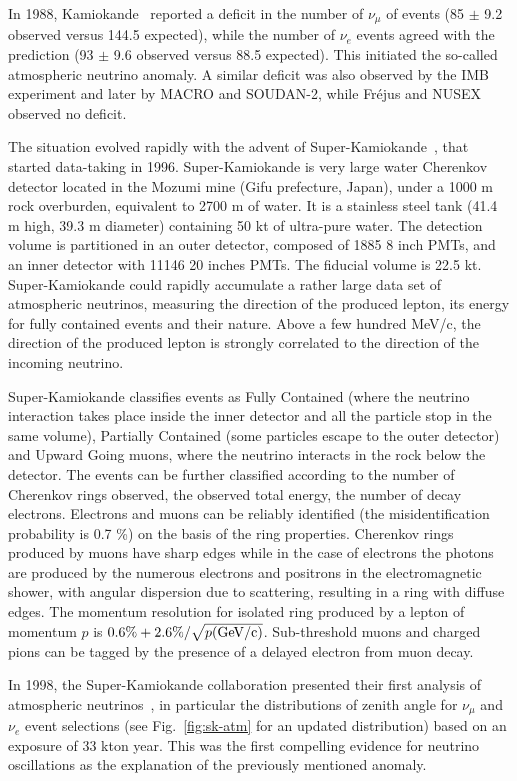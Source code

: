 In 1988, Kamiokande~\cite{kam88} reported a deficit in the number of $\nu_\mu$ of events (85 $\pm$ 9.2 observed versus 144.5 expected), while the number of $\nu_e$ events agreed with the prediction (93 $\pm$ 9.6 observed versus 88.5 expected). 
This initiated the so-called atmospheric neutrino anomaly. A similar deficit was also observed by the IMB experiment and later by MACRO and SOUDAN-2, while Fr\'ejus and NUSEX observed no deficit. 

The situation evolved rapidly with the advent of Super-Kamiokande~\cite{sknim}, that started data-taking in 1996. Super-Kamiokande is very large water Cherenkov detector located in the Mozumi mine (Gifu prefecture, Japan), under a 1000 m rock overburden, equivalent to 2700 m of water. It is a stainless steel tank (41.4 m high, 39.3 m diameter) containing 50 kt of ultra-pure water. The detection volume is partitioned in an outer detector, composed of 1885 8 inch PMTs, and an inner detector with 11146 20 inches PMTs. The fiducial volume is 22.5 kt. Super-Kamiokande could rapidly accumulate a rather large data set of atmospheric neutrinos, measuring the direction of the produced lepton, its energy for fully contained events and their nature. Above a few hundred MeV/c, the direction of the produced lepton is strongly correlated to the direction of the incoming neutrino.

Super-Kamiokande classifies events as Fully Contained (where the neutrino interaction takes place inside the inner detector and all the particle stop in the same volume), Partially Contained (some particles escape to the outer detector) and Upward Going muons, where the neutrino interacts in the rock below the detector. The events can be further classified according to the number of Cherenkov rings observed, the observed total energy, the number of decay electrons. Electrons and muons can be reliably identified (the misidentification probability is 0.7 \%) on the basis of the ring properties. Cherenkov rings produced by muons have sharp edges while in the case of electrons the photons are produced by the numerous electrons and positrons in the electromagnetic shower, with angular dispersion due to scattering, resulting in a ring with diffuse edges. The momentum resolution for isolated ring produced by a lepton of momentum $p$ is $0.6\% +2.6\%/\sqrt{p ({\rm GeV/c})}$. Sub-threshold muons and charged pions can be tagged by the presence of a delayed electron from muon decay.

In 1998, the Super-Kamiokande collaboration presented their first analysis of atmospheric neutrinos~\cite{Fukuda:1998mi}, in particular the distributions of zenith angle for $ \nu_\mu$ and $\nu_e$ event selections (see Fig.~\ref{fig:sk-atm} for an updated distribution) based on an exposure of 33 kton year. This was the first compelling evidence for neutrino oscillations as the explanation of the previously mentioned anomaly.  

